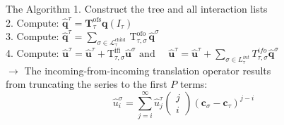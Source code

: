 \begin{frame}{The Algorithm}
  1. Construct the tree and all interaction lists\\
  \vspace{3mm}
  2. Compute: $\hat{\mathbf{q}}^{\tau}=\mathbf{T}_{\tau}^{\mathrm{ofs}} \mathbf{q}\left(I_{\tau}\right)$\\
  \vspace{3mm}
  3. Compute: $\hat{\mathbf{q}}^{\tau}=\sum_{\sigma \in \mathcal{L}_{\tau}^{\text {child }}} \mathrm{T}_{\tau, \sigma}^{\text {ofo }} \hat{\mathbf{q}}^{\sigma}$\\
  \vspace{3mm}
  4. Compute: $\hat{\mathbf{u}}^{\tau}=\hat{\mathbf{u}}^{\tau}+\mathrm{T}_{\tau, \sigma}^{\mathrm{ifi}} \hat{\mathbf{u}}^{\sigma} \text { and } \quad \hat{\boldsymbol{u}}^{\tau}=\hat{\boldsymbol{u}}^{\tau}+\sum_{\sigma \in L_{\tau}^{i n t}} T_{\tau, \sigma}^{i f o} \widehat{\boldsymbol{q}}^{\sigma}$\\
  \vspace{8mm}
  \setlength{\parindent}{4ex}  $\rightarrow$ The incoming-from-incoming translation operator results\\ \setlength{\parindent}{4ex} from truncating the series to the first $P$ terms:
  $$
  \hat{u}_{i}^{\sigma}=\sum_{j=i}^{\infty} \hat{u}_{j}^{\tau}\left(\begin{array}{l}
  j \\
  i
  \end{array}\right)\left(\boldsymbol{c}_{\sigma}-\boldsymbol{c}_{\tau}\right)^{j-i}
  $$\\

  
\end{frame}

